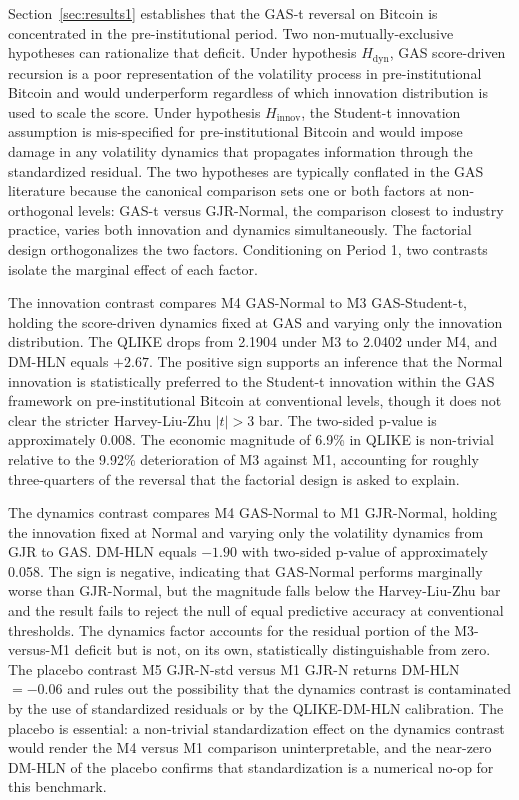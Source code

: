 Section~\ref{sec:results1} establishes that the GAS-t reversal on Bitcoin is concentrated in the pre-institutional period. Two non-mutually-exclusive hypotheses can rationalize that deficit. Under hypothesis $H_{\text{dyn}}$, GAS score-driven recursion is a poor representation of the volatility process in pre-institutional Bitcoin and would underperform regardless of which innovation distribution is used to scale the score. Under hypothesis $H_{\text{innov}}$, the Student-t innovation assumption is mis-specified for pre-institutional Bitcoin and would impose damage in any volatility dynamics that propagates information through the standardized residual. The two hypotheses are typically conflated in the GAS literature because the canonical comparison sets one or both factors at non-orthogonal levels: GAS-t versus GJR-Normal, the comparison closest to industry practice, varies both innovation and dynamics simultaneously. The factorial design orthogonalizes the two factors. Conditioning on Period 1, two contrasts isolate the marginal effect of each factor.

The innovation contrast compares M4 GAS-Normal to M3 GAS-Student-t, holding the score-driven dynamics fixed at GAS and varying only the innovation distribution. The QLIKE drops from 2.1904 under M3 to 2.0402 under M4, and DM-HLN equals $+2.67$. The positive sign supports an inference that the Normal innovation is statistically preferred to the Student-t innovation within the GAS framework on pre-institutional Bitcoin at conventional levels, though it does not clear the stricter Harvey-Liu-Zhu $|t| > 3$ bar. The two-sided p-value is approximately 0.008. The economic magnitude of 6.9\% in QLIKE is non-trivial relative to the 9.92\% deterioration of M3 against M1, accounting for roughly three-quarters of the reversal that the factorial design is asked to explain.

The dynamics contrast compares M4 GAS-Normal to M1 GJR-Normal, holding the innovation fixed at Normal and varying only the volatility dynamics from GJR to GAS. DM-HLN equals $-1.90$ with two-sided p-value of approximately 0.058. The sign is negative, indicating that GAS-Normal performs marginally worse than GJR-Normal, but the magnitude falls below the Harvey-Liu-Zhu bar and the result fails to reject the null of equal predictive accuracy at conventional thresholds. The dynamics factor accounts for the residual portion of the M3-versus-M1 deficit but is not, on its own, statistically distinguishable from zero. The placebo contrast M5 GJR-N-std versus M1 GJR-N returns DM-HLN $= -0.06$ and rules out the possibility that the dynamics contrast is contaminated by the use of standardized residuals or by the QLIKE-DM-HLN calibration. The placebo is essential: a non-trivial standardization effect on the dynamics contrast would render the M4 versus M1 comparison uninterpretable, and the near-zero DM-HLN of the placebo confirms that standardization is a numerical no-op for this benchmark.

